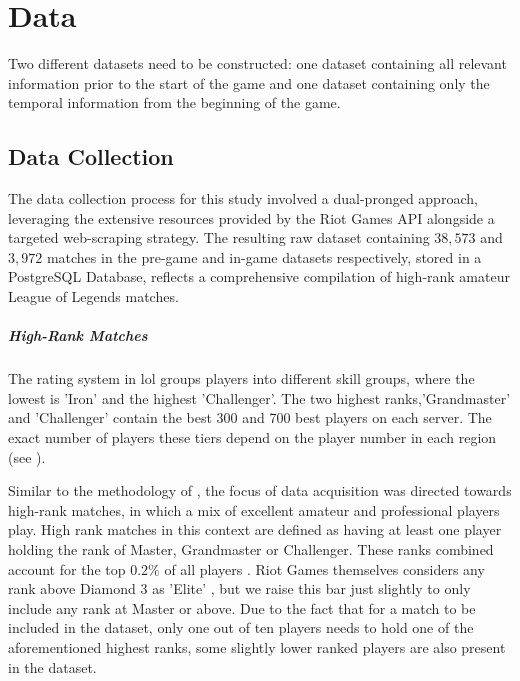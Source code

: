\documentclass[12pt, a4paper, headinclude, twoside, plainheadsepline, open=right, numbers=noenddot, hidelinks, toc=listof, toc=bibliography]{scrreprt}
\begin{document}
\chapter{Data}
\label{chap:data}

Two different datasets need to be constructed: one dataset containing all relevant information prior to the start of the game and one dataset containing only the temporal information from the beginning of the game.


\section{Data Collection}
\label{sec:datacoll}

The data collection process for this study involved a dual-pronged approach, leveraging the extensive resources provided by the Riot Games API alongside a targeted web-scraping strategy.
The resulting raw dataset containing $38,573$ and  $3,972$ matches in the pre-game and in-game datasets respectively, stored in a PostgreSQL Database, reflects a comprehensive compilation of high-rank amateur League of Legends matches.

\paragraph{High-Rank Matches}
The rating system in \ac{lol} groups players into different skill groups, where the lowest is 'Iron' and the highest 'Challenger'.
The two highest ranks,'Grandmaster' and 'Challenger' contain the best 300 and 700 best players on each server.
The exact number of players these tiers depend on the player number in each region (see \cite{riotgamesMasterGrandmasterChallenger2023}).

Similar to the methodology of \citeauthor{zhangPredictionEsportsGame2021}, the focus of data acquisition was directed towards high-rank matches, in which a mix of excellent amateur and professional players play.
High rank matches in this context are defined as having at least one player holding the rank of Master, Grandmaster or Challenger.
These ranks combined account for the top $0.2\%$ of all players \cite{riotgamesRankedTiersDivisions2023}.
Riot Games themselves considers any rank above Diamond 3 as 'Elite' \cite{riotgamesDevBalanceFramework2020}, but we raise this bar just slightly to only include any rank at Master or above.
Due to the fact that for a match to be included in the dataset, only one out of ten players needs to hold one of the aforementioned highest ranks, some slightly lower ranked players are also present in the dataset.
\end{document}
